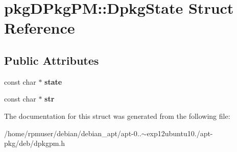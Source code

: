 \section{pkg\-D\-Pkg\-P\-M\-:\-:\-Dpkg\-State \-Struct \-Reference}
\label{structpkgDPkgPM_1_1DpkgState}
\subsection*{\-Public \-Attributes}
\begin{DoxyCompactItemize}
\item 
const char $\ast$ {\bfseries state}\label{structpkgDPkgPM_1_1DpkgState_a2417314f8d1d56a2761bc79c2f89e571}

\item 
const char $\ast$ {\bfseries str}\label{structpkgDPkgPM_1_1DpkgState_af25d6dc49269fa2003ac7c7fa6f13915}

\end{DoxyCompactItemize}


\-The documentation for this struct was generated from the following file\-:\begin{DoxyCompactItemize}
\item 
/home/rpmuser/debian/debian\-\_\-apt/apt-\/0..$\sim$exp12ubuntu10./apt-\/pkg/deb/dpkgpm.\-h\end{DoxyCompactItemize}
